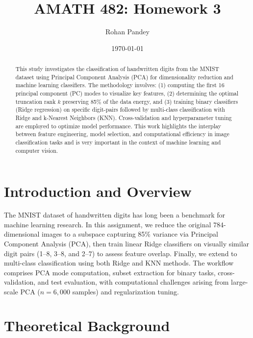 \documentclass[11pt]{amsart}
\title{AMATH 482: Homework 3}
\author{Rohan Pandey} %
\date{\today} %
\begin{document}
\begin{abstract}
    This study investigates the classification of handwritten digits from the MNIST dataset using Principal Component Analysis (PCA) for dimensionality reduction and machine learning classifiers. The methodology involves: (1) computing the first 16 principal component (PC) modes to visualize key features, (2) determining the optimal truncation rank \( k \) preserving 85\% of the data energy, and (3) training binary classifiers (Ridge regression) on specific digit-pairs followed by multi-class classification with Ridge and k-Nearest Neighbors (KNN). Cross-validation and hyperparameter tuning are employed to optimize model performance. This work highlights the interplay between feature engineering, model selection, and computational efficiency in image classification tasks and is very important in the context of machine learning and computer vision.
\end{abstract}

\maketitle

\section{Introduction and Overview}\label{sec:Introduction}

The MNIST dataset of handwritten digits \cite{LeCun1998} has long been a benchmark for machine learning research. In this assignment, we reduce the original 784-dimensional images to a subspace capturing 85\% variance via Principal Component Analysis (PCA), then train linear Ridge classifiers on visually similar digit pairs (1--8, 3--8, and 2--7) to assess feature overlap. Finally, we extend to multi-class classification using both Ridge and KNN methods. The workflow comprises PCA mode computation, subset extraction for binary tasks, cross-validation, and test evaluation, with computational challenges arising from large-scale PCA (\(n=6 {,}000\) samples) and regularization tuning.


\section{Theoretical Background}
\end{document}
